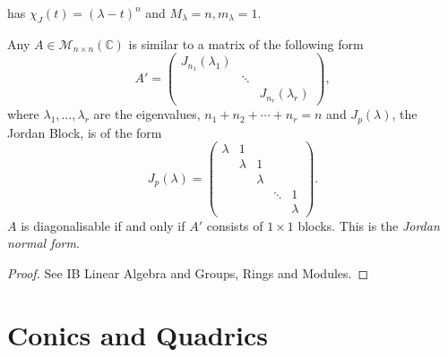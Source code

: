 \documentclass[10pt]{article}
\begin{document}
    has $ \chi_J(t) = (\lambda-t)^n $ and $ M_\lambda=n,m_\lambda=1 $.
    \begin{theorem}
        Any $ A\in \mathcal{M}_{n\times n}(\mathbb{C}) $ is similar to a matrix of the following form
        \[
            A'=\begin{pmatrix}
                \boxed{J_{n_1}(\lambda_1)}&&\\
                &\ddots&\\
                &&\boxed{J_{n_r}(\lambda_r)}
            \end{pmatrix},
        \]
        where $\lambda_1,\ldots,\lambda_r$ are the eigenvalues, $n_1+n_2+\cdots+n_r=n$ and $J_p(\lambda)$, the Jordan Block, is of the form
        \[
            J_p(\lambda)=\begin{pmatrix}
                \lambda&1&&&\\
                &\lambda&1&&\\
                &&\lambda&&\\
                &&&\ddots&1\\
                &&&&\lambda
            \end{pmatrix}.
        \]
        $A$ is diagonalisable if and only if $A'$ consists of $1\times 1$ blocks. This is the \textit{Jordan normal form}.
    \end{theorem}
    \begin{proof}
        See IB Linear Algebra and Groups, Rings and Modules.
    \end{proof}
    \section{Conics and Quadrics}
\end{document}
